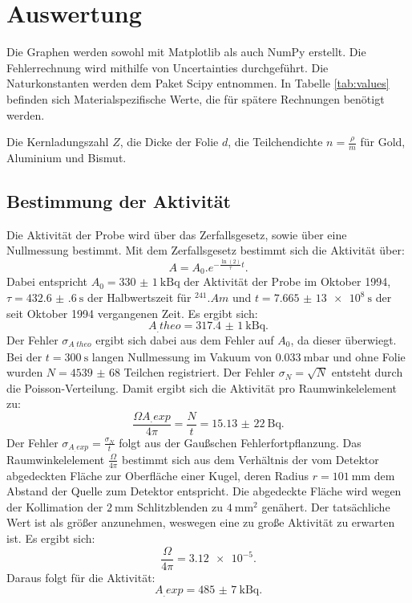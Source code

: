 \section{Auswertung}
\label{sec:Auswertung}

Die Graphen werden sowohl mit Matplotlib \cite{matplotlib} als auch NumPy \cite{numpy} erstellt. Die Fehlerrechnung wird mithilfe von Uncertainties \cite{uncertainties} durchgeführt. Die Naturkonstanten werden dem Paket Scipy \cite{scipy} entnommen.
In Tabelle \ref{tab:values} befinden sich Materialspezifische Werte, die für spätere Rechnungen benötigt werden.

\begin{table}
	\centering
	\caption{Die Kernladungszahl $Z$, die Dicke der Folie $d$, die Teilchendichte $n=\frac{\rho}{m}$ für Gold, Aluminium und Bismut.}
	
	\label{tab:values}
\end{table}

\subsection{Bestimmung der Aktivität}

Die Aktivität der Probe wird über das Zerfallsgesetz, sowie über eine Nullmessung bestimmt.
Mit dem Zerfallsgesetz bestimmt sich die Aktivität über: 
\[
A = A_0 .e^{-\frac{\ln(2)}{\tau}t}\text{.}
\]
Dabei entspricht $A_0 = \SI{330(1)}{\kilo\becquerel}$ der Aktivität der Probe im Oktober 1994, $\tau = \SI{432.6(6)}{\second}$ \cite{Americium} der Halbwertszeit für $^{241}.{Am}$ und $t = \SI{7,665(13)e8}{\second}$ der seit Oktober 1994 vergangenen Zeit. Es ergibt sich:
\[
A_.{theo} = \SI{317.4(10)}{\kilo\becquerel} \text{.}
\]
Der Fehler $\sigma_{A_.{theo}}$ ergibt sich dabei aus dem Fehler auf $A_0$, da dieser überwiegt.
Bei der $t = \SI{300}{\second}$ langen Nullmessung im Vakuum von $\SI{0,033}{\milli\bar}$ und ohne Folie wurden $N = \num{4539(68)}$ Teilchen registriert. Der Fehler $\sigma_N=\sqrt{N}$ entsteht durch die Poisson-Verteilung. 
Damit ergibt sich die Aktivität pro Raumwinkelelement zu:
\[
\frac{\Omega A_.{exp}}{4\pi} = \frac{N}{t} = \SI{15,13(22)}{\becquerel} \text{.}
\] 
Der Fehler $\sigma_{A_.{exp}}=\frac{\sigma_N}{t}$ folgt aus der Gaußschen Fehlerfortpflanzung. 
Das Raumwinkelelement $\frac{\Omega}{4\pi}$ bestimmt sich aus dem Verhältnis der vom Detektor abgedeckten Fläche zur Oberfläche einer Kugel, deren Radius $r = \SI{101}{\milli\metre}$ \cite{V16} dem Abstand der Quelle zum Detektor entspricht. Die abgedeckte Fläche wird wegen der Kollimation der $\SI{2}{\milli\metre}$ Schlitzblenden zu $\SI{4}{\milli\metre\squared}$ genähert. Der tatsächliche Wert ist als größer anzunehmen, weswegen eine zu große Aktivität zu erwarten ist. Es ergibt sich:
\[
\frac{\Omega}{4\pi} = \num{3,12e-5}\text{.}
\]   
Daraus folgt für die Aktivität:
\[
A_.{exp} = \SI{485(7)}{\kilo\becquerel} \text{.}
\]

